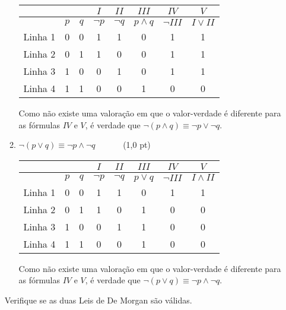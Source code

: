 \documentclass[11pt,a4paper,oneside]{article}
\begin{document}
\begin{enumerate}
\begin{enumerate}
		{\color{verde} 
			\begin{center}
				\begin{tabular}{c|cc|c|c|c|c|c}
				 &  &  & $I$ & $II$ & $III$ & $IV$ & $V$\\
				\hline
				 & $p$ & $q$ & $\neg p$ & $\neg q$ & $p \wedge q$ & $\neg III$ & $I \vee II$ \\ 
				\hline 
				Linha 1 & 0 & 0 & 1 & 1 & 0 & 1 & 1\\
				Linha 2 & 0 & 1 & 1 & 0 & 0 & 1 & 1\\
				Linha 3 & 1 & 0 & 0 & 1 & 0 & 1 & 1\\ 
				Linha 4 & 1 & 1 & 0 & 0 & 1 & 0 & 0\\ 
				\hline 
				\end{tabular} 
			\end{center}
			
			Como não existe uma valoração em que o valor-verdade é diferente para as fórmulas $IV$ e $V$, é verdade que $\neg(p \wedge q) \equiv \neg p \vee \neg q$.\\
		}
		\item $\neg(p \vee q) \equiv \neg p \wedge \neg q$ \ \ \ \ \ \ (1,0 pt)\\
		
		{\color{verde} 
			\begin{center}
				\begin{tabular}{c|cc|c|c|c|c|c}
				 &  &  & $I$ & $II$ & $III$ & $IV$ & $V$\\
				\hline
				 & $p$ & $q$ & $\neg p$ & $\neg q$ & $p \vee q$ & $\neg III$ & $I \wedge II$ \\ 
				\hline 
				Linha 1 & 0 & 0 & 1 & 1 & 0 & 1 & 1\\
				Linha 2 & 0 & 1 & 1 & 0 & 1 & 0 & 0\\
				Linha 3 & 1 & 0 & 0 & 1 & 1 & 0 & 0\\ 
				Linha 4 & 1 & 1 & 0 & 0 & 1 & 0 & 0\\ 
				\hline 
				\end{tabular} 
			\end{center}
			
			Como não existe uma valoração em que o valor-verdade é diferente para as fórmulas $IV$ e $V$, é verdade que $\neg(p \vee q) \equiv \neg p \wedge \neg q$.
			}
	\end{enumerate} 
	
	Verifique se as duas Leis de De Morgan são válidas.
	

\end{enumerate}
\end{document}
